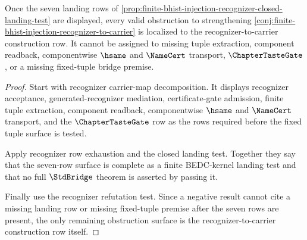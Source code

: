 \begin{theorem}
\label{thm:finite-bhist-injection-recognizer-carrier-obstruction-locality}
Once the seven landing rows of \autoref{prop:finite-bhist-injection-recognizer-closed-landing-test} are displayed, every valid obstruction to strengthening \autoref{conj:finite-bhist-injection-recognizer-to-carrier} is localized to the recognizer-to-carrier construction row. It cannot be assigned to missing tuple extraction, component readback, componentwise $\hsame$ and $\NameCert$ transport, $\ChapterTasteGate$, or a missing fixed-tuple bridge premise.
\end{theorem}
\begin{proof}
Start with recognizer carrier-map decomposition. It displays recognizer acceptance, generated-recognizer mediation, certificate-gate admission, finite tuple extraction, component readback, componentwise $\hsame$ and $\NameCert$ transport, and the $\ChapterTasteGate$ row as the rows required before the fixed tuple surface is tested.

Apply recognizer row exhaustion and the closed landing test. Together they say that the seven-row surface is complete as a finite BEDC-kernel landing test and that no full $\StdBridge$ theorem is asserted by passing it.

Finally use the recognizer refutation test. Since a negative result cannot cite a missing landing row or missing fixed-tuple premise after the seven rows are present, the only remaining obstruction surface is the recognizer-to-carrier construction row itself.
\end{proof}

